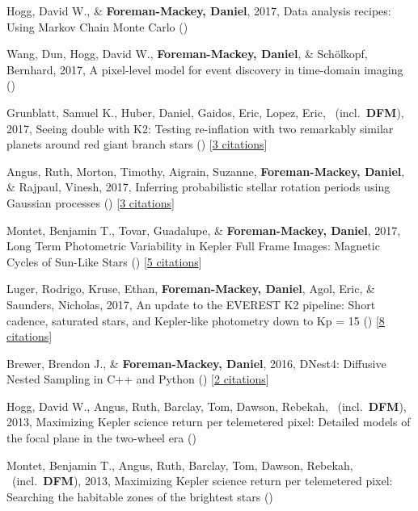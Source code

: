 \item[{\color{numcolor}\scriptsize9}] Hogg, David W., \& \textbf{Foreman-Mackey, Daniel}, 2017, Data analysis recipes: Using Markov Chain Monte Carlo ()

\item[{\color{numcolor}\scriptsize8}] Wang, Dun, Hogg, David W., \textbf{Foreman-Mackey, Daniel}, \& Sch{\"o}lkopf, Bernhard, 2017, A pixel-level model for event discovery in time-domain imaging ()

\item[{\color{numcolor}\scriptsize7}] Grunblatt, Samuel K., Huber, Daniel, Gaidos, Eric, Lopez, Eric, \etal\ (incl.\ \textbf{DFM}), 2017, Seeing double with K2: Testing re-inflation with two remarkably similar planets around red giant branch stars () [\href{http://adsabs.harvard.edu/abs/2017arXiv170605865G}{3 citations}]

\item[{\color{numcolor}\scriptsize6}] Angus, Ruth, Morton, Timothy, Aigrain, Suzanne, \textbf{Foreman-Mackey, Daniel}, \& Rajpaul, Vinesh, 2017, Inferring probabilistic stellar rotation periods using Gaussian processes () [\href{http://adsabs.harvard.edu/abs/2017arXiv170605459A}{3 citations}]

\item[{\color{numcolor}\scriptsize5}] Montet, Benjamin T., Tovar, Guadalupe, \& \textbf{Foreman-Mackey, Daniel}, 2017, Long Term Photometric Variability in Kepler Full Frame Images: Magnetic Cycles of Sun-Like Stars () [\href{http://adsabs.harvard.edu/abs/2017arXiv170507928M}{5 citations}]

\item[{\color{numcolor}\scriptsize4}] Luger, Rodrigo, Kruse, Ethan, \textbf{Foreman-Mackey, Daniel}, Agol, Eric, \& Saunders, Nicholas, 2017, An update to the EVEREST K2 pipeline: Short cadence, saturated stars, and Kepler-like photometry down to Kp = 15 () [\href{http://adsabs.harvard.edu/abs/2017arXiv170205488L}{8 citations}]

\item[{\color{numcolor}\scriptsize3}] Brewer, Brendon J., \& \textbf{Foreman-Mackey, Daniel}, 2016, DNest4: Diffusive Nested Sampling in C++ and Python () [\href{http://adsabs.harvard.edu/abs/2016arXiv160603757B}{2 citations}]

\item[{\color{numcolor}\scriptsize2}] Hogg, David W., Angus, Ruth, Barclay, Tom, Dawson, Rebekah, \etal\ (incl.\ \textbf{DFM}), 2013, Maximizing Kepler science return per telemetered pixel: Detailed models of the focal plane in the two-wheel era ()

\item[{\color{numcolor}\scriptsize1}] Montet, Benjamin T., Angus, Ruth, Barclay, Tom, Dawson, Rebekah, \etal\ (incl.\ \textbf{DFM}), 2013, Maximizing Kepler science return per telemetered pixel: Searching the habitable zones of the brightest stars ()